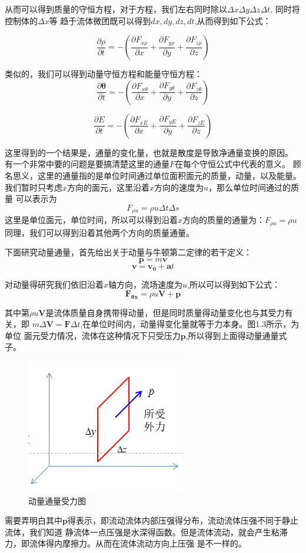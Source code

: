 \documentclass[11pt,twoside]{article}
\begin{document}
从而可以得到质量的守恒方程，对于方程，我们左右同时除以$\Delta x \Delta y \Delta z \Delta t$, 同时将控制体的$\Delta x$等
趋于流体微团既可以得到$dx, dy, dz, dt$,从而得到如下公式：

$$\frac{\partial \rho}{\partial t} = -(\frac{\partial F_{x\rho}}{\partial x} + \frac{\partial F_{y\rho}}{\partial y}+\frac{\partial F_{z\rho}}{\partial z})$$

类似的，我们可以得到动量守恒方程和能量守恒方程：
$$\frac{\partial \bm{\theta}}{\partial t} = -(\frac{\partial F_{x\theta}}{\partial x} + \frac{\partial F_{y\theta}}{\partial y}+\frac{\partial F_{z\theta}}{\partial z})$$

$$\frac{\partial E}{\partial t} = -(\frac{\partial F_{xE}}{\partial x} + \frac{\partial F_{yE}}{\partial y}+\frac{\partial F_{zE}}{\partial z})$$

这里得到的一个结果是，通量的变化量，也就是散度是导致净通量变换的原因。
有一个非常中要的问题是要搞清楚这里的通量$F$在每个守恒公式中代表的意义。
顾名思义，这里的通量指的是单位时间通过单位面积面元的质量，动量，以及能量。
我们暂时只考虑$x$方向的面元，这里沿着$x$方向的速度为$u$，那么单位时间通过的质量
可以表示为
$$F_{\rho u} = \rho u \Delta t \Delta s$$
这里是单位面元，单位时间，所以可以得到沿着$x$方向的质量的通量为：$F_{\rho u} = \rho u$
同理，我们可以得到沿着其他两个方向的质量通量。

下面研究动量通量，首先给出关于动量与牛顿第二定律的若干定义：
\begin{equation*}
    \bm{p} = m \bm{v}
\end{equation*}
\begin{equation*}
    \bm{v} = \bm{v_0} +\bm{a}t
\end{equation*}

对动量得研究我们依旧沿着$x$轴方向，流场速度为$u$,所以可以得到如下公式：
\begin{equation*}
    \bm{F_{\theta x}} = \rho u \bm{V} + \bm{p}
\end{equation*}

其中第$\rho u \bm{V}$是流体质量自身携带得动量，但是同时质量得动量变化也与其受力有关，即
$m\Delta \bm{V} = \bm{F}\Delta t$,在单位时间内，动量得变化量就等于力本身。图1.3所示，为单位
面元受力情况，流体在这种情况下只受压力$\bm{p}$,所以得到上面得动量通量式子。

\begin{figure}[htbp]
    \begin{center}
        \includegraphics{通量.png}
    \end{center}
    \caption{动量通量受力图}
    
\end{figure}

需要弄明白其中$\bm{p}$得表示，即流动流体内部压强得分布，流动流体压强不同于静止流体，我们知道
静流体一点压强是水深得函数。但是流体流动，就会产生粘滞力，即流体得内摩擦力。从而在流体流动方向上压强
是不一样的。
\end{document}
